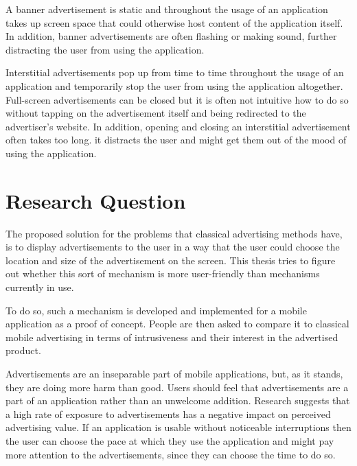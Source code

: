 A banner advertisement is static and throughout the usage of an application takes up screen space that could otherwise host content of the application itself. In addition, banner advertisements are often flashing or making sound, further distracting the user from using the application.

Interstitial advertisements pop up from time to time throughout the usage of an application and temporarily stop the user from using the application altogether. Full-screen advertisements can be closed but it is often not intuitive how to do so without tapping on the advertisement itself and being redirected to the advertiser's website. In addition, opening and closing an interstitial advertisement often takes too long. it distracts the user and might get them out of the mood of using the application.


\section{Research Question}

The proposed solution for the problems that classical advertising methods have, is to display advertisements to the user in a way that the user could choose the location and size of the advertisement on the screen. This thesis tries to figure out whether this sort of mechanism is more user-friendly than mechanisms currently in use.

To do so, such a mechanism is developed and implemented for a mobile application as a proof of concept. People are then asked to compare it to classical mobile advertising in terms of intrusiveness and their interest in the advertised product.

Advertisements are an inseparable part of mobile applications, but, as it stands, they are doing more harm than good. Users should feel that advertisements are a part of an application rather than an unwelcome addition. Research suggests that a high rate of exposure to advertisements has a negative impact on perceived advertising value\cite{parissa2005increasingadvalue}\cite{consumer2004melody}. If an application is usable without noticeable interruptions then the user can choose the pace at which they use the application and might pay more attention to the advertisements, since they can choose the time to do so.

